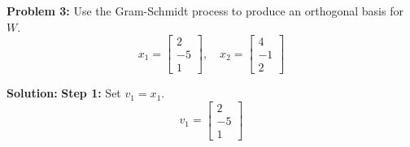 \documentclass[11pt, letterpaper]{article}
\theoremstyle{definition}
\theoremstyle{remark}
\begin{document}
\vspace{1em}
\textbf{Problem 3:} 
Use the Gram-Schmidt process to produce an orthogonal basis for $W$.
\[ x_1 = \begin{bmatrix} 2 \\ -5 \\ 1 \end{bmatrix}, \quad x_2 = \begin{bmatrix} 4 \\ -1 \\ 2 \end{bmatrix} \]

\textbf{Solution:}
\textbf{Step 1:} Set $v_1 = x_1$.
\[ v_1 = \begin{bmatrix} 2 \\ -5 \\ 1 \end{bmatrix} \]
\end{document}
